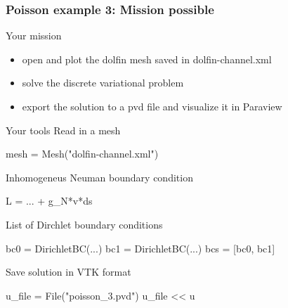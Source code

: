\begin{frame}[fragile,shrink=10]
    \frametitle{Poisson example 3: Mission possible}
    \begin{block}{Your mission}
        \begin{itemize}
            \item open and plot the dolfin mesh saved in
                dolfin-channel.xml
            \item solve the discrete variational problem
            \item export the solution to a pvd file and visualize
                it in Paraview
        \end{itemize}
    \end{block}
    \begin{block}{Your tools}
            Read in a mesh
            \vspace{-1em}
        \begin{python}
mesh = Mesh("dolfin-channel.xml")
        \end{python}
        Inhomogeneus Neuman boundary condition
        \vspace{-1em}
        \begin{python}
L = ... + g_N*v*ds
        \end{python}
        List of Dirchlet boundary conditions
        \vspace{-1em}
        \begin{python}
            bc0 = DirichletBC(...)
            bc1 = DirichletBC(...)
            bcs = [bc0, bc1]
        \end{python}
        Save solution in VTK format
        \vspace{-1em}
        \begin{python}
u_file = File("poisson_3.pvd")
u_file << u
        \end{python}
    \end{block}
\end{frame}
